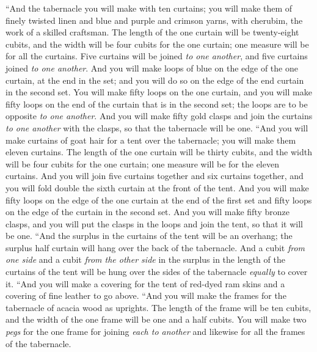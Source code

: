 \begin{biblechapter} %
 “And the tabernacle you will make with ten curtains; you will make them of finely twisted linen and blue and purple and crimson yarns, with cherubim, the work of a skilled craftsman.
\verse The length of the one curtain will be twenty-eight cubits, and the width will be four cubits for the one curtain; one measure will be for all the curtains.
\verse Five curtains will be joined \textit{to one another}, and five curtains joined \textit{to one another}.
\verse And you will make loops of blue on the edge of the one curtain, at the end in the set; and you will do so on the edge of the end curtain in the second set.
\verse You will make fifty loops on the one curtain, and you will make fifty loops on the end of the curtain that is in the second set; the loops are to be opposite \textit{to one another}.
\verse And you will make fifty gold clasps and join the curtains \textit{to one another} with the clasps, so that the tabernacle will be one.
\verse “And you will make curtains of goat hair for a tent over the tabernacle; you will make them eleven curtains.
\verse The length of the one curtain will be thirty cubits, and the width will be four cubits for the one curtain; one measure will be for the eleven curtains.
\verse And you will join five curtains together and six curtains together, and you will fold double the sixth curtain at the front of the tent.
\verse And you will make fifty loops on the edge of the one curtain at the end of the first set and fifty loops on the edge of the curtain in the second set.
\verse And you will make fifty bronze clasps, and you will put the clasps in the loops and join the tent, so that it will be one.
\verse “And the surplus in the curtains of the tent will be an overhang; the surplus half curtain will hang over the back of the tabernacle.
\verse And a cubit \textit{from one side} and a cubit \textit{from the other side} in the surplus in the length of the curtains of the tent will be hung over the sides of the tabernacle \textit{equally} to cover it.
\verse “And you will make a covering for the tent of red-dyed ram skins and a covering of fine leather to go above.
\verse “And you will make the frames for the tabernacle of acacia wood as uprights.
\verse The length of the frame will be ten cubits, and the width of the one frame will be one and a half cubits.
\verse You will make two \textit{pegs} for the one frame for joining \textit{each to another} and likewise for all the frames of the tabernacle.

\end{biblechapter}
